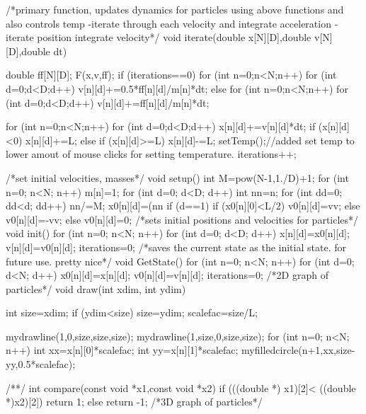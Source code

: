 /*primary function, updates dynamics for particles using above functions and also controls temp
-iterate through each velocity and integrate acceleration
-iterate position integrate velocity*/
void iterate(double x[N][D],double v[N][D],double dt){
  double ff[N][D];
  F(x,v,ff);
  if (iterations==0)
    for (int n=0;n<N;n++)
      for (int d=0;d<D;d++)
	v[n][d]+=0.5*ff[n][d]/m[n]*dt;
  else
    for (int n=0;n<N;n++)
      for (int d=0;d<D;d++)
	v[n][d]+=ff[n][d]/m[n]*dt;
  
  for (int n=0;n<N;n++)
    for (int d=0;d<D;d++){
      x[n][d]+=v[n][d]*dt;
      if (x[n][d]<0) x[n][d]+=L;
      else if (x[n][d]>=L) x[n][d]-=L;
    }
  setTemp();//added set temp to lower amout of mouse clicks for setting temperature.
  iterations++;
}

/*set initial velocities, masses*/
void setup(){
  int M=pow(N-1,1./D)+1;
  for (int n=0; n<N; n++){
    m[n]=1;
    for (int d=0; d<D; d++){
      int nn=n;
      for (int dd=0; dd<d; dd++) nn/=M;
      x0[n][d]=(nn%
      if (d==1){
	if (x0[n][0]<L/2)
	  v0[n][d]=vv;
	else v0[n][d]=-vv;
      }
      else v0[n][d]=0;
    }
  }
}
/*sets initial positions and velocities for particles*/
void init(){
  for (int n=0; n<N; n++)
    for (int d=0; d<D; d++){
      x[n][d]=x0[n][d];
      v[n][d]=v0[n][d];
    }
  iterations=0;
}
/*saves the current state as the initial state. for future use. pretty nice*/
void GetState(){
  for (int n=0; n<N; n++)
    for (int d=0; d<N; d++){
      x0[n][d]=x[n][d];
      v0[n][d]=v[n][d];
    }
  iterations=0;
}
/*2D graph of particles*/
void draw(int xdim, int ydim){
  int size=xdim;
  if (ydim<size) size=ydim;
  scalefac=size/L;

  mydrawline(1,0,size,size,size);
  mydrawline(1,size,0,size,size);
  for (int n=0; n<N; n++){
    int xx=x[n][0]*scalefac;
    int yy=x[n][1]*scalefac;
    myfilledcircle(n+1,xx,size-yy,0.5*scalefac);
  }
}
/**/
int compare(const void *x1,const void *x2){
  if (((double *) x1)[2]< ((double *)x2)[2]) return 1;
  else return -1;
}
/*3D graph of particles*/
